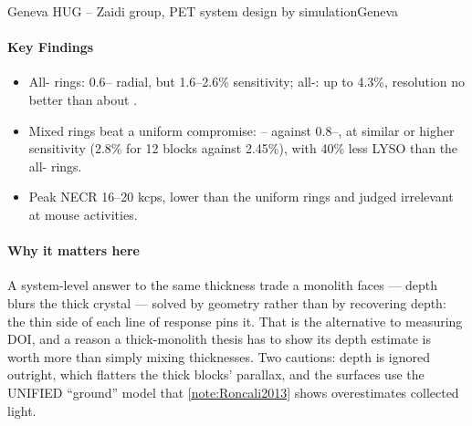 \begin{programnote}{Geneva HUG -- Zaidi group, PET system design by simulation}{Geneva}
\begin{papernote}
\paragraph{Key Findings}
\begin{itemize}
	\item All- rings: 0.6-- radial, but 1.6--2.6\% sensitivity;
		all-: up to 4.3\%, resolution no better than about .
	\item Mixed rings beat a uniform  compromise: --
		against 0.8--, at similar or higher sensitivity (2.8\% for 12
		blocks against 2.45\%), with 40\% less LYSO than the all-
		rings.
	\item Peak NECR 16--20 kcps, lower than the uniform rings and judged
		irrelevant at mouse activities.
\end{itemize}

\paragraph{Why it matters here}
A system-level answer to the same thickness trade a monolith faces --- depth
blurs the thick crystal --- solved by geometry rather than by recovering depth:
the thin side of each line of response pins it. That is the alternative to
measuring DOI, and a reason a thick-monolith thesis has to show its depth
estimate is worth more than simply mixing thicknesses. Two cautions: depth is
ignored outright, which flatters the thick blocks' parallax, and the surfaces
use the UNIFIED ``ground'' model that \ref{note:Roncali2013} shows
overestimates collected light.

\end{papernote}

\end{programnote}

